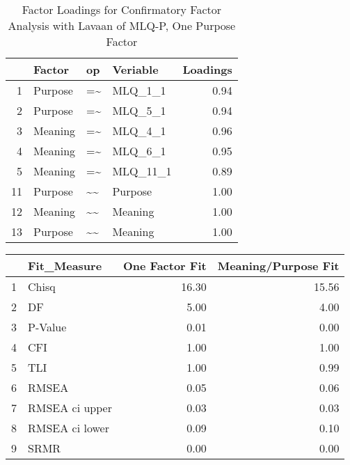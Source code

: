 \documentclass{article}\usepackage[]{graphicx}\usepackage[]{color}
\begin{document}
\begin{table}[ht]
\centering
\begin{tabular}{rlllr}
  \hline
 & Factor & op & Veriable & Loadings \\ 
  \hline
1 & Purpose & =\~{} & MLQ\_1\_1 & 0.94 \\ 
  2 & Purpose & =\~{} & MLQ\_5\_1 & 0.94 \\ 
  3 & Meaning & =\~{} & MLQ\_4\_1 & 0.96 \\ 
  4 & Meaning & =\~{} & MLQ\_6\_1 & 0.95 \\ 
  5 & Meaning & =\~{} & MLQ\_11\_1 & 0.89 \\ 
  11 & Purpose & \~{}\~{} & Purpose & 1.00 \\ 
  12 & Meaning & \~{}\~{} & Meaning & 1.00 \\ 
  13 & Purpose & \~{}\~{} & Meaning & 1.00 \\ 
   \hline
\end{tabular}
\caption{Factor Loadings for Confirmatory Factor Analysis with Lavaan of MLQ-P, One Purpose Factor} 
\end{table}

\begin{table}[ht]
\centering
\begin{tabular}{rlrr}
  \hline
 & Fit\_Measure & One Factor Fit & Meaning/Purpose Fit \\ 
  \hline
1 & Chisq & 16.30 & 15.56 \\ 
  2 & DF & 5.00 & 4.00 \\ 
  3 & P-Value & 0.01 & 0.00 \\ 
  4 & CFI & 1.00 & 1.00 \\ 
  5 & TLI & 1.00 & 0.99 \\ 
  6 & RMSEA & 0.05 & 0.06 \\ 
  7 & RMSEA ci upper & 0.03 & 0.03 \\ 
  8 & RMSEA ci lower & 0.09 & 0.10 \\ 
  9 & SRMR & 0.00 & 0.00 \\ 
   \hline
\end{tabular}
\end{table}
\end{document}
